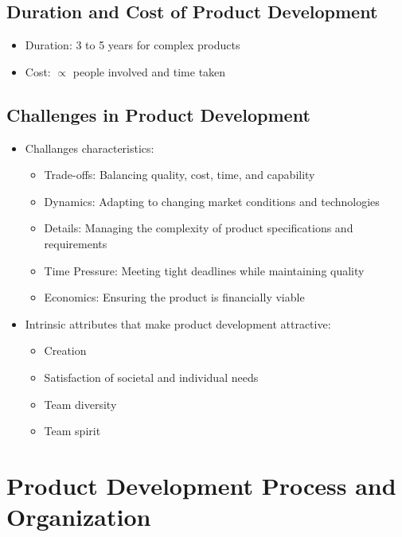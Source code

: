 \documentclass[a4paper,12pt,openany]{book}
\begin{document}
\section{Duration and Cost of Product Development}
\begin{itemize}
    \item Duration: 3 to 5 years for complex products
    \item Cost: $\propto$ people involved and time taken
\end{itemize}

\section{Challenges in Product Development}
\begin{itemize}
    \item Challanges characteristics:
    \begin{itemize}
        \item Trade-offs: Balancing quality, cost, time, and capability
        \item Dynamics: Adapting to changing market conditions and technologies
        \item Details: Managing the complexity of product specifications and requirements
        \item Time Pressure: Meeting tight deadlines while maintaining quality
        \item Economics: Ensuring the product is financially viable
    \end{itemize}
    \item Intrinsic attributes that make product development attractive:
    \begin{itemize}
        \item Creation
        \item Satisfaction of societal and individual needs
        \item Team diversity
        \item Team spirit
    \end{itemize}
\end{itemize}

\chapter{Product Development Process and Organization}
\end{document}
